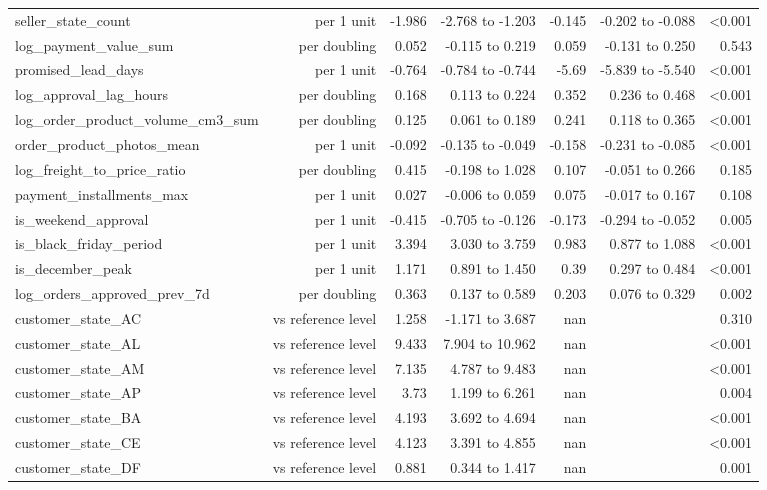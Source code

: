 \begin{table}[htbp]
\begin{tabular}{lrrrrrr}
seller\_state\_count & per 1 unit & -1.986 & -2.768 to -1.203 & -0.145 & -0.202 to -0.088 & <0.001 \\
log\_payment\_value\_sum & per doubling & 0.052 & -0.115 to 0.219 & 0.059 & -0.131 to 0.250 & 0.543 \\
promised\_lead\_days & per 1 unit & -0.764 & -0.784 to -0.744 & -5.69 & -5.839 to -5.540 & <0.001 \\
log\_approval\_lag\_hours & per doubling & 0.168 & 0.113 to 0.224 & 0.352 & 0.236 to 0.468 & <0.001 \\
log\_order\_product\_volume\_cm3\_sum & per doubling & 0.125 & 0.061 to 0.189 & 0.241 & 0.118 to 0.365 & <0.001 \\
order\_product\_photos\_mean & per 1 unit & -0.092 & -0.135 to -0.049 & -0.158 & -0.231 to -0.085 & <0.001 \\
log\_freight\_to\_price\_ratio & per doubling & 0.415 & -0.198 to 1.028 & 0.107 & -0.051 to 0.266 & 0.185 \\
payment\_installments\_max & per 1 unit & 0.027 & -0.006 to 0.059 & 0.075 & -0.017 to 0.167 & 0.108 \\
is\_weekend\_approval & per 1 unit & -0.415 & -0.705 to -0.126 & -0.173 & -0.294 to -0.052 & 0.005 \\
is\_black\_friday\_period & per 1 unit & 3.394 & 3.030 to 3.759 & 0.983 & 0.877 to 1.088 & <0.001 \\
is\_december\_peak & per 1 unit & 1.171 & 0.891 to 1.450 & 0.39 & 0.297 to 0.484 & <0.001 \\
log\_orders\_approved\_prev\_7d & per doubling & 0.363 & 0.137 to 0.589 & 0.203 & 0.076 to 0.329 & 0.002 \\
customer\_state\_AC & vs reference level & 1.258 & -1.171 to 3.687 & nan &  & 0.310 \\
customer\_state\_AL & vs reference level & 9.433 & 7.904 to 10.962 & nan &  & <0.001 \\
customer\_state\_AM & vs reference level & 7.135 & 4.787 to 9.483 & nan &  & <0.001 \\
customer\_state\_AP & vs reference level & 3.73 & 1.199 to 6.261 & nan &  & 0.004 \\
customer\_state\_BA & vs reference level & 4.193 & 3.692 to 4.694 & nan &  & <0.001 \\
customer\_state\_CE & vs reference level & 4.123 & 3.391 to 4.855 & nan &  & <0.001 \\
customer\_state\_DF & vs reference level & 0.881 & 0.344 to 1.417 & nan &  & 0.001 \\

\end{tabular}
\end{table}
